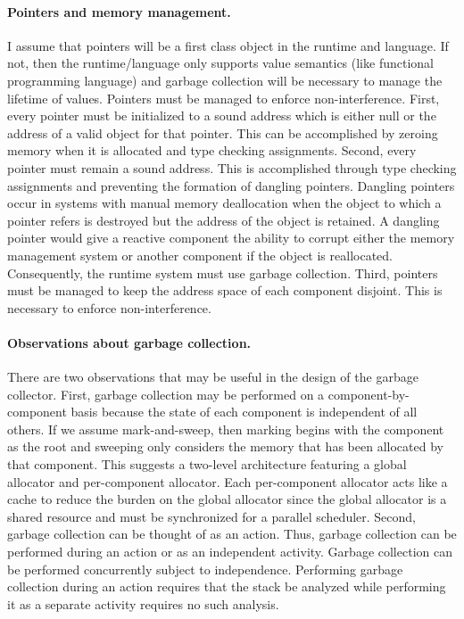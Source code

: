 \paragraph{Pointers and memory management.}
I assume that pointers will be a first class object in the runtime and language.
If not, then the runtime/language only supports value semantics (like functional programming language) and garbage collection will be necessary to manage the lifetime of values.
Pointers must be managed to enforce non-interference.
First, every pointer must be initialized to a sound address which is either null or the address of a valid object for that pointer.
This can be accomplished by zeroing memory when it is allocated and type checking assignments.
Second, every pointer must remain a sound address.
This is accomplished through type checking assignments and preventing the formation of dangling pointers.
Dangling pointers occur in systems with manual memory deallocation when the object to which a pointer refers is destroyed but the address of the object is retained.
A dangling pointer would give a reactive component the ability to corrupt either the memory management system or another component if the object is reallocated.
Consequently, the runtime system must use garbage collection.
Third, pointers must be managed to keep the address space of each component disjoint.
This is necessary to enforce non-interference.

\paragraph{Observations about garbage collection.}
There are two observations that may be useful in the design of the garbage collector.
First, garbage collection may be performed on a component-by-component basis because the state of each component is independent of all others.
If we assume mark-and-sweep, then marking begins with the component as the root and sweeping only considers the memory that has been allocated by that component.
This suggests a two-level architecture featuring a global allocator and per-component allocator.
Each per-component allocator acts like a cache to reduce the burden on the global allocator since the global allocator is a shared resource and must be synchronized for a parallel scheduler.
Second, garbage collection can be thought of as an action.
Thus, garbage collection can be performed during an action or as an independent activity.
Garbage collection can be performed concurrently subject to independence.
Performing garbage collection during an action requires that the stack be analyzed while performing it as a separate activity requires no such analysis.

